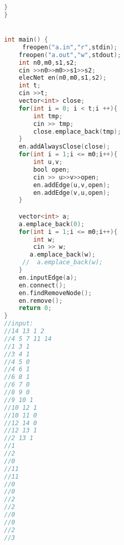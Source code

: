 \documentclass[withoutpreface,bwprint]{cumcmthesis} %
\begin{document}
\begin{appendices}
\begin{lstlisting}[language=C]
    }
}


int main() {
     freopen("a.in","r",stdin);
    freopen("a.out","w",stdout);
    int n0,m0,s1,s2;
    cin >>n0>>m0>>s1>>s2;
    elecNet en(n0,m0,s1,s2);
    int t;
    cin >>t;
    vector<int> close;
    for(int i = 0; i < t;i ++){
        int tmp;
        cin >> tmp;
        close.emplace_back(tmp);
    }
    en.addAlwaysClose(close);
    for(int i = 1;i <= m0;i++){
        int u,v;
        bool open;
        cin >> u>>v>>open;
        en.addEdge(u,v,open);
        en.addEdge(v,u,open);
    }

    vector<int> a;
    a.emplace_back(0);
    for(int i = 1;i <= m0;i++){
        int w;
        cin >> w;
       a.emplace_back(w);
     //  a.emplace_back(w);
    }
    en.inputEdge(a);
    en.connect();
    en.findRemoveNode();
    en.remove();
    return 0;
}
//input:
//14 13 1 2
//4 5 7 11 14
//1 3 1
//3 4 1
//4 5 0
//4 6 1
//6 8 1
//6 7 0
//8 9 0
//9 10 1
//10 12 1
//10 11 0
//12 14 0
//12 13 1
//2 13 1
//1
//2
//0
//11
//11
//0
//0
//2
//2
//0
//0
//2
//3
\end{lstlisting}

\end{appendices}
\end{document}
